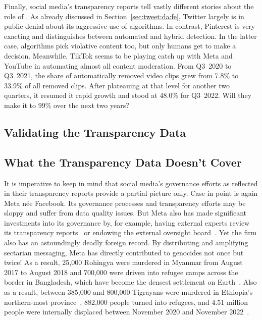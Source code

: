 Finally, social media's transparency reports tell vastly different stories about
the role of \AI. As already discussed in Section~\ref{sec:tweet:da:fe}, Twitter
largely is in public denial about its aggressive use of algorithms. In contrast,
Pinterest is very exacting and distinguishes between automated and hybrid
detection. In the latter case, algorithms pick violative content too, but only
humans get to make a decision. Meanwhile, TikTok seems to be playing catch up
with Meta and YouTube in automating almost all content moderation. From Q3~2020
to Q3~2021, the share of automatically removed video clips grew from 7.8\% to
33.9\% of all removed clips. After plateauing at that level for another two
quarters, it resumed it rapid growth and stood at 48.0\% for Q3~2022. Will they
make it to 99\% over the next two years?


\subsection{Validating the Transparency Data}
\label{sec:census:validation}




\subsection{What the Transparency Data Doesn't Cover}
\label{sec:census:limits}

It is imperative to keep in mind that social media's governance efforts as
reflected in their transparency reports provide a partial picture only. Case in
point is again Meta n\'ee Facebook. Its governance processes and transparency
efforts may be sloppy and suffer from data quality issues. But Meta also has
made significant investments into its governance by, for example, having
external experts review its transparency reports~\cite{BradfordGriselea2019} or
endowing the external oversight board~\cite{BoteroMarinoGreeneea2020}. Yet the
firm also has an astoundingly deadly foreign record. By distributing and
amplifying sectarian messaging, Meta has directly contributed to genocides not
once but twice! As a result, 25,000 Rohingya were murdered in Myanmar from
August 2017 to August 2018 and 700,000 were driven into refugee camps across the
border in Bangladesh, which have become the densest settlement on
Earth~\cite{DeGuzman2022,HumanRightsCouncil2018}. Also as a result, between
385,000 and 800,000 Tigrayans were murdered in Ethiopia's northern-most
province~\cite{AnnysVandenBemptea2021,ChothiaBekit2022}, 882,000 people turned
into refugees, and 4.51 million people were internally displaced between
November 2020 and November 2022~\cite{UNICEF2023}.

